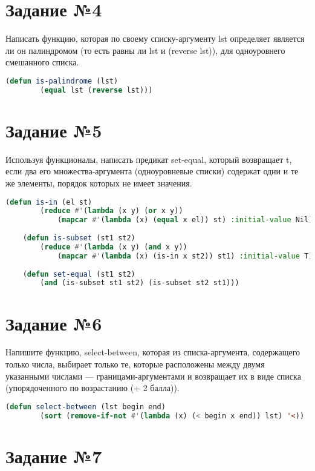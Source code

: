 \section{Задание №4}

Написать функцию, которая по своему списку-аргументу lst определяет является ли он палиндромом (то есть равны ли lst и (reverse lst)), для одноуровнего смешанного списка.

\begin{lstlisting}[language=Lisp]
	(defun is-palindrome (lst)
		(equal lst (reverse lst)))
\end{lstlisting}

\section{Задание №5}

Используя функционалы, написать предикат set-equal, который возвращает t, если два его множества-аргумента (одноуровневые списки) содержат одни и те же элементы, порядок которых не имеет значения.

\begin{lstlisting}[language=Lisp]
	(defun is-in (el st)
		(reduce #'(lambda (x y) (or x y))
			(mapcar #'(lambda (x) (equal x el)) st) :initial-value Nil))
	
	(defun is-subset (st1 st2)
		(reduce #'(lambda (x y) (and x y))
			(mapcar #'(lambda (x) (is-in x st2)) st1) :initial-value T))
	
	(defun set-equal (st1 st2)
		(and (is-subset st1 st2) (is-subset st2 st1)))
\end{lstlisting}

\section{Задание №6}

Напишите функцию, select-between, которая из списка-аргумента, содержащего только числа, выбирает только те, которые расположены между двумя указанными числами --- границами-аргументами и возвращает их в виде списка (упорядоченного по возрастанию (+ 2 балла)).

\begin{lstlisting}[language=Lisp]
	(defun select-between (lst begin end)
		(sort (remove-if-not #'(lambda (x) (< begin x end)) lst) '<))
\end{lstlisting}

\section{Задание №7}

